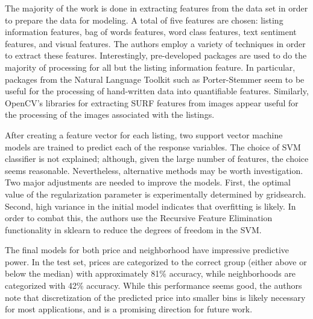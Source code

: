 \documentclass{article}
\begin{document}
The majority of the work is done in extracting features from the data set in order to prepare the data for modeling. A total of five features are chosen: listing information features, bag of words features, word class features, text sentiment features, and visual features. The authors employ a variety of techniques in order to extract these features. Interestingly, pre-developed packages are used to do the majority of processing for all but the listing information feature. In particular, packages from the Natural Language Toolkit such as Porter-Stemmer seem to be useful for the processing of hand-written data into quantifiable features. Similarly, OpenCV's libraries for extracting SURF features from images appear useful for the processing of the images associated with the listings.

After creating a feature vector for each listing, two support vector machine models are trained to predict each of the response variables. The choice of SVM classifier is not explained; although, given the large number of features, the choice seems reasonable. Nevertheless, alternative methods may be worth investigation. Two major adjustments are needed to improve the models. First, the optimal value of the regularization parameter is experimentally determined by gridsearch. Second, high variance in the initial model indicates that overfitting is likely. In order to combat this, the authors use the Recursive Feature Elimination functionality in sklearn to reduce the degrees of freedom in the SVM.  

The final models for both price and neighborhood have impressive predictive power. In the test set, prices are categorized to the correct group (either above or below the median) with approximately 81\% accuracy, while neighborhoods are categorized with 42\% accuracy. While this performance seems good, the authors note that discretization of the predicted price into smaller bins is likely necessary for most applications, and is a promising direction for future work. 
\end{document}
